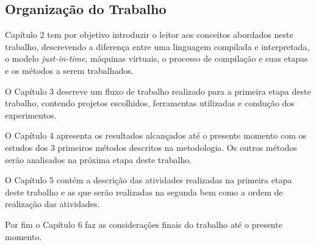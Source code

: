 \subsection*{Organização do Trabalho}

Capítulo 2 tem por objetivo introduzir o leitor aos conceitos abordados
 neste trabalho, descrevendo a diferença entre uma linguagem compilada e
 interpretada, o modelo \textit{just-in-time}, máquinas virtuais, o processo de compilação
 e suas etapas e os métodos a serem trabalhados.

O Capítulo 3 descreve um fluxo de trabalho realizado para a primeira etapa
 deste trabalho, contendo projetos escolhidos, ferramentas utilizadas e
 condução dos experimentos.

O Capítulo 4 apresenta os resultados alcançados até o presente momento com
 os estudos dos 3 primeiros métodos descritos na metodologia. Os outros
 métodos serão analisados na próxima etapa deste trabalho.

O Capítulo 5 contém a descrição das atividades realizadas na primeira
 etapa deste trabalho e as que serão realizadas na segunda bem como a ordem
 de realização das atividades.

Por fim o Capítulo 6  faz as considerações finais do trabalho até o presente
 momento.
